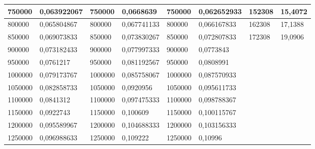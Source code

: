 \documentclass[11pt]{article}
\begin{document}
\begin{table}[!ht]
\begin{tabular}{|l|l|l|l|l|l|l|l|}
        750000 & 0,063922067 & 750000 & 0,0668639 & 750000 & 0,062652933 & 152308 & 15,4072 \\ \hline
        800000 & 0,065804867 & 800000 & 0,067741133 & 800000 & 0,066167833 & 162308 & 17,1388 \\ \hline
        850000 & 0,069073833 & 850000 & 0,073830267 & 850000 & 0,072807833 & 172308 & 19,0906 \\ \hline
        900000 & 0,073182433 & 900000 & 0,077997333 & 900000 & 0,0773843 & ~ & ~ \\ \hline
        950000 & 0,0761217 & 950000 & 0,081192567 & 950000 & 0,0808991 & ~ & ~ \\ \hline
        1000000 & 0,079173767 & 1000000 & 0,085758067 & 1000000 & 0,087570933 & ~ & ~ \\ \hline
        1050000 & 0,082858733 & 1050000 & 0,0920956 & 1050000 & 0,095611733 & ~ & ~ \\ \hline
        1100000 & 0,0841312 & 1100000 & 0,097475333 & 1100000 & 0,098788367 & ~ & ~ \\ \hline
        1150000 & 0,0922743 & 1150000 & 0,100609 & 1150000 & 0,100115767 & ~ & ~ \\ \hline
        1200000 & 0,095589967 & 1200000 & 0,104688333 & 1200000 & 0,103156333 & ~ & ~ \\ \hline
        1250000 & 0,096988633 & 1250000 & 0,109222 & 1250000 & 0,10996 & ~ & \\\hline
    \end{tabular}
\end{table}
\end{document}
